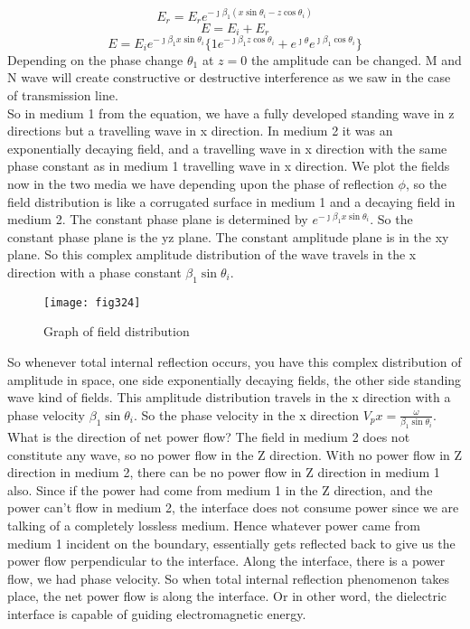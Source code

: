\begin{equation}
E_r = E_r e^{- \jmath \beta_1(x\sin\theta_i - z\cos\theta_i)}
\end{equation}
\begin{equation*}
E = E_i + E_r
\end{equation*}
\begin{equation*}
E = E_i e^{- \jmath \beta_1x\sin\theta_i}\{ 1e^{- \jmath \beta_1z\cos\theta_i} + e^{\jmath \theta}
e^{\jmath \beta_1\cos\theta_i} \}
\end{equation*}
Depending on the phase change $\theta_1$ at $z = 0$ the amplitude can be changed. M and N wave will create constructive or destructive interference as we saw in the case of transmission line. \\
So in medium 1 from the equation, we have a fully developed standing wave in z directions but a travelling wave in x direction. In medium 2 it was an exponentially decaying field, and a travelling wave in x direction with the same phase constant as in medium 1 travelling wave in x direction. We plot the fields now in the two media we have depending upon the phase of reflection $\phi$, so the field distribution is like a corrugated surface in medium 1 and a decaying field in medium 2. The constant phase plane is determined by $e^{- \jmath \beta_1x\sin\theta_i}$. So the constant phase plane is the yz plane. The constant amplitude plane is in the xy plane. So this complex amplitude distribution of the wave travels in the x direction with a phase constant $\beta_1\sin\theta_i$.

\begin{figure}[h]
	\centering
	\texttt{[image: fig324]}
	\caption{Graph of field distribution}
\end{figure}

So whenever total internal reflection occurs, you have this complex distribution of amplitude in space, one side exponentially decaying fields, the other side standing wave kind of fields. This amplitude distribution travels in the x direction with a phase velocity $\beta_1\sin\theta_i$. So the phase velocity in the x direction $V_px = \frac{\omega}{\beta_1\sin\theta_i}$. What is the direction of net power flow? The field in medium 2 does not constitute any wave, so no power flow in the Z direction. With no power flow in Z direction in medium 2, there can be no power flow in Z direction in medium 1 also. Since if the power had come from medium 1 in the Z direction, and the power can't flow in medium 2, the interface does not consume power since we are talking of a completely lossless medium. Hence whatever power came from medium 1 incident on the boundary, essentially gets reflected back to give us the power flow perpendicular to the interface. Along the interface, there is a power flow, we had phase velocity. So when total internal reflection phenomenon takes place, the net power flow is along the interface. Or in other word, the dielectric interface is capable of guiding electromagnetic energy.\\




